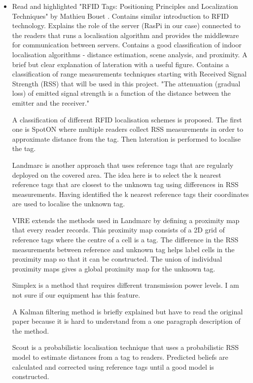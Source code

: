 \documentclass[a4paper,12pt]{article}
\begin{document}
\begin{itemize}
	\item Read and highlighted "RFID Tags: Positioning Principles and Localization Techniques" by Mathieu Bouet \cite{Bouet2008}. Contains similar introduction to RFID technology. Explains the role of the server (RasPi in our case) connected to the readers that runs a localisation algorithm and provides the middleware for communication between servers. Contains a good classification of indoor localisation algorithms - distance estimation, scene analysis, and proximity. A brief but clear explanation of lateration with a useful figure. Contains a classification of range measurements techniques starting with Received Signal Strength (RSS) that will be used in this project. "The attenuation (gradual loss) of emitted signal strength is a function of the distance between the emitter and the receiver."
	
	A classification of different RFID localisation schemes is proposed. The first one is SpotON where multiple readers collect RSS measurements in order to approximate distance from the tag. Then lateration is performed to localise the tag. 
	
	Landmarc is another approach that uses reference tags that are regularly deployed on the covered area. The idea here is to select the k nearest reference tags that are closest to the unknown tag using differences in RSS measurements. Having identified the k nearest reference tags their coordinates are used to localise the unknown tag. 
	
	VIRE extends the methods used in Landmarc by defining a proximity map that every reader records. This proximity map consists of a 2D grid of reference tags where the centre of a cell is a tag. The difference in the RSS measurements between reference and unknown tag helps label cells in the proximity map so that it can be constructed. The union of individual proximity maps gives a global proximity map for the unknown tag.
	
	Simplex is a method that requires different transmission power levels. I am not sure if our equipment has this feature.
	
	A Kalman filtering method is briefly explained but have to read the original paper because it is hard to understand from a one paragraph description of the method.
	
	Scout is a probabilistic localisation technique that uses a probabilistic RSS model to estimate distances from a tag to readers. Predicted beliefs are calculated and corrected using reference tags until a good model is constructed.


\end{itemize}
\end{document}
